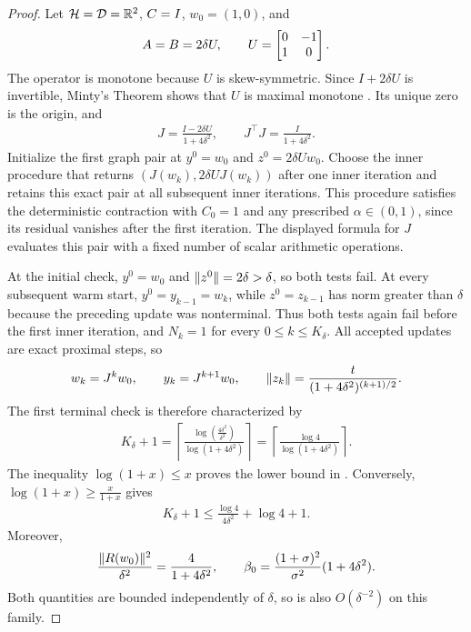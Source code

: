 \documentclass[11pt]{article}
\begin{document}
\begin{proof}
    Let $\mathcal{H}=\mathcal{D}=\mathbb{R}^2$, ${C}=I$, $w_0=(1,0)$, and
    \begin{align}
        {A}={B}=2\delta U, \qquad
        U=\begin{bmatrix}0&-1\\1&0\end{bmatrix}.
    \end{align}
    The operator is monotone because $U$ is skew-symmetric.
    Since $I+2\delta U$ is invertible, Minty's Theorem shows that $U$ is maximal monotone \citep[Theorem 21.1]{bauschkeConvexAnalysisMonotone2017}.
    Its unique zero is the origin, and
    \begin{align}
        J=\frac{I- 2 \delta U }{1+ 4 \delta^2}, \qquad
        J^\top J=\frac{I}{1+ 4 \delta^2}.
    \end{align}
    Initialize the first graph pair at $y^0=w_0$ and $z^0= 2 \delta U w_0$.
    Choose the inner procedure that returns $(J(w_k), 2 \delta U J(w_k))$ after one inner iteration and retains this exact pair at all subsequent inner iterations.
    This procedure satisfies the deterministic contraction with $C_0=1$ and any prescribed $\alpha\in(0,1)$, since its residual vanishes after the first iteration.
    The displayed formula for $J$ evaluates this pair with a fixed number of scalar arithmetic operations.

    At the initial check, $y^0=w_0$ and $\lVert z^0\rVert=2\delta>\delta$, so both tests fail.
    At every subsequent warm start, $y^0=y_{k-1}=w_k$, while $z^0=z_{k-1}$ has norm greater than $\delta$ because the preceding update was nonterminal.
    Thus both tests again fail before the first inner iteration, and $N_k=1$ for every $0\leq k\leq K_\delta$.
    All accepted updates are exact proximal steps, so
    \begin{align}
        w_k=J^k w_0, \qquad y_k=J^{k+1}w_0, \qquad
        \lVert z_k\rVert=\frac{t}{(1+ 4 \delta^2)^{(k+1)/2}}.
    \end{align}
    The first terminal check is therefore characterized by
    \begin{align}
        K_\delta+1=\left\lceil\frac{\log( \frac{4 \delta^2}{\delta^2})}{\log(1+ 4 \delta^2)}\right\rceil
        =\left\lceil\frac{\log 4}{\log(1+4\delta^2)}\right\rceil.
    \end{align}
    The inequality $\log(1+x)\leq x$ proves the lower bound in .
    Conversely, $\log(1+x)\geq \frac{x}{1+x}$ gives
    \begin{align}
        K_\delta+1\leq\frac{\log 4}{4\delta^2}+\log 4+1.
    \end{align}
    Moreover,
    \begin{align}
        \frac{\lVert R(w_0)\rVert^2}{\delta^2}=\frac{4}{1+4\delta^2}, \qquad
        \beta_0=\frac{(1+\sigma)^2}{\sigma^2}(1+4\delta^2).
    \end{align}
    Both quantities are bounded independently of $\delta$, so  is also $O(\delta^{-2})$ on this family.
\end{proof}
\end{document}
